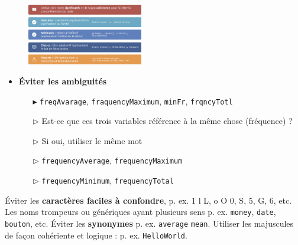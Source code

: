 \documentclass[16pt]{report}
\begin{document}
\begin{multicols*}{2}
    \begin{figure}[H]
        \begin{center}
            \includegraphics[width=0.45\textwidth]{BonnesPraiquesProg.png}
        \end{center}
    \end{figure}


    \begin{itemize}
        \item \textbf{Éviter les ambiguités}  
            \begin{itemize}
                \item[$\blacktriangleright$] \texttt{freqAvarage}, \texttt{fraquencyMaximum}, \texttt{minFr}, 
                    \texttt{frqncyTotl} 
                \item[$\rhd$] Est-ce que ces trois variables référence à la même chose (fréquence) ?
                \item[$\rhd$] Si oui, utiliser le même mot 
                \item[$\rhd$] \texttt{frequencyAverage}, 
                    \texttt{frequencyMaximum}
                \item[$\rhd$] \texttt{frequencyMinimum}, \texttt{frequencyTotal}  
            \end{itemize}
    \end{itemize}

    Éviter les \textbf{caractères faciles à confondre}, p. ex. 1 l L, o O 0, S, 5, G, 6, etc. Les 
    \textcolor{myb}{noms trompeurs} ou \textcolor{myb}{génériques} ayant plusieurs sens p. ex. 
    \texttt{money}, \texttt{date}, \texttt{bouton}, etc. Éviter les \textbf{synonymes} p. ex.  
    \texttt{average} \texttt{mean}. Utiliser les majuscules de façon cohériente et logique : p. ex. 
    \texttt{HelloWorld}.  



\end{multicols*}
\end{document}
